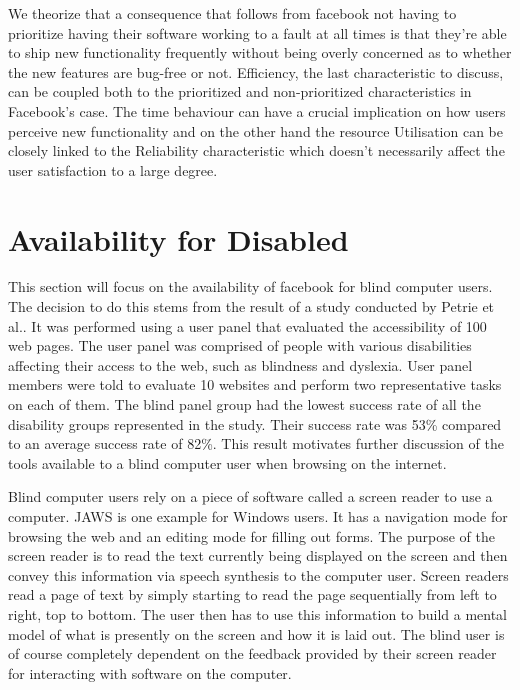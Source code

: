 \documentclass[conference]{IEEEtran}
\begin{document}
We theorize that a consequence that follows from facebook not having to prioritize having their software working to a fault at all times is that they’re able to ship new functionality frequently without being overly concerned as to whether the new features are bug-free or not. Efficiency, the last characteristic to discuss, can be coupled both to the prioritized and non-prioritized characteristics in Facebook’s case. The time behaviour can have a crucial implication on how users perceive new functionality and on the other hand the resource Utilisation can be closely linked to the Reliability characteristic which doesn’t necessarily affect the user satisfaction to a large degree.

\section{Availability for Disabled}
\label{availability}


This section will focus on the availability of facebook for blind computer users. The decision to do this stems from the result of a study conducted by Petrie et al.\cite{petrie2004}. It was performed using a user panel that evaluated the accessibility of 100 web pages. The user panel was comprised of people with various disabilities affecting their access to the web, such as blindness and dyslexia. User panel members were told to evaluate 10 websites and perform two representative tasks on each of them. The blind panel group had the lowest success rate of all the disability groups represented in the study. Their success rate was 53\% compared to an average success rate of 82\%. This result motivates further discussion of the tools available to a blind computer user when browsing on the internet.

Blind computer users rely on a piece of software called a screen reader to use a computer. JAWS\cite{jaws} is one example for Windows users. It has a navigation mode for browsing the web and an editing mode for filling out forms. The purpose of the screen reader is to read the text currently being displayed on the screen and then convey this information via speech synthesis to the computer user. Screen readers read a page of text by simply starting to read the page sequentially from left to right, top to bottom. The user then has to use this information to build a mental model of what is presently on the screen and how it is laid out. The blind user is of course completely dependent on the feedback provided by their screen reader for interacting with software on the computer.
\end{document}
